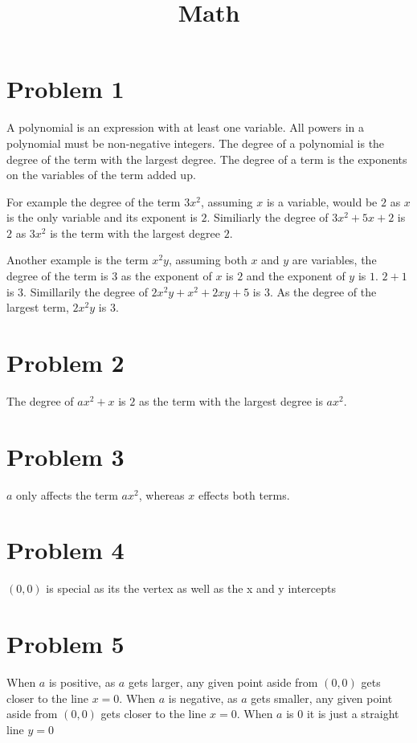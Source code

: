 \documentclass[12pt, letterpaper, twoside]{article}
\title{Math}
\begin{document}
	
	\maketitle
\section{Problem 1}
A polynomial is an expression with at least one variable. All powers in a polynomial must be non-negative integers. The degree of a polynomial is the degree of the term with the largest degree. The degree of a term is the exponents on the variables of the term added up.\par
For example the degree of the term $3x^2$, assuming $x$ is a variable, would be $2$ as $x$ is the only variable and its exponent is $2$. Similiarly the degree of $3x^2 + 5x +2$ is $2$ as $3x^2$ is the term with the largest degree $2$. \par
Another example is the term $x^2y$, assuming both $x$ and $y$ are variables, the degree of the term is $3$ as the exponent of $x$ is $2$ and the exponent of $y$ is $1$. $2 + 1$ is $3$. Simillarily the degree of $2x^2y + x^2 + 2xy + 5$ is $3$. As the degree of the largest term, $2x^2y$ is $3$. 
\section{Problem 2}
The degree of $ax^2 + x$ is $2$ as the term with the largest degree is $ax^2$.
\section{Problem 3}
$a$ only affects the term $ax^2$, whereas $x$ effects both terms.
\section{Problem 4}
$(0,0)$ is special as its the vertex as well as the x and y intercepts
\section{Problem 5}
When $a$ is positive, as $a$ gets larger, any given point aside from $(0,0)$ gets closer to the line $x = 0$. When $a$ is negative, as $a$ gets smaller, any given point aside from $(0,0)$ gets closer to the line $x = 0$. When $a$ is $0$ it is just a straight line $y=0$
\end{document}
